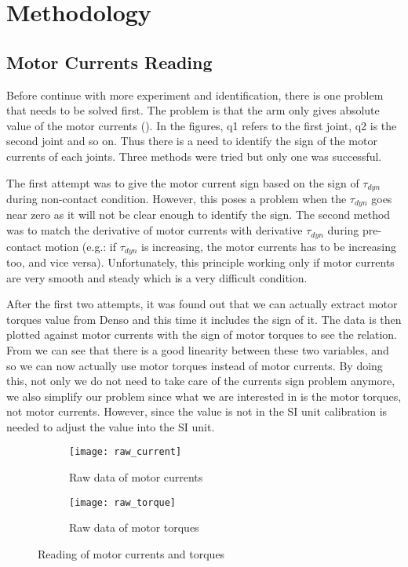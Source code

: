 \chapter{Methodology}
\section{Motor Currents Reading}
\label{motor currents}

Before continue with more experiment and identification, there is one problem that needs to be solved first. The problem is that the arm only gives absolute value of the motor currents (). In the figures, q1 refers to the first joint, q2 is the second joint and so on. Thus there is a need to identify the sign of the motor currents of each joints. Three methods were tried but only one was successful.

The first attempt was to give the motor current sign based on the sign of $\tau_{dyn}$ during non-contact condition. However, this poses a problem when the $\tau_{dyn}$ goes near zero as it will not be clear enough to identify the sign. The second method was to match the derivative of motor currents with derivative $\tau_{dyn}$ during pre-contact motion (e.g.: if $\tau_{dyn}$ is increasing, the motor currents has to be increasing too, and vice versa). Unfortunately, this principle working only if motor currents are very smooth and steady which is a very difficult condition.

After the first two attempts, it was found out that we can actually extract motor torques value from Denso and this time it includes the sign of it. The data is then plotted against motor currents with the sign of motor torques to see the relation. From  we can see that there is a good linearity between these two variables, and so we can now actually use motor torques instead of motor currents. By doing this, not only we do not need to take care of the currents sign problem anymore, we also simplify our problem since what we are interested in is the motor torques, not motor currents. However, since the value is not in the SI unit calibration is needed to adjust the value into the SI unit. 

\begin{figure}[H]
  \begin{subfigure}[t]{0.5\textwidth}
    \centering
    \texttt{[image: raw\_current]} 
    \caption{Raw data of motor currents }
    \label{fig:raw current}
  \end{subfigure}
  \begin{subfigure}[t]{0.5\textwidth}
    \centering
    \texttt{[image: raw\_torque]}
    \caption{Raw data of motor torques }
    \label{fig:raw torque}
  \end{subfigure}
  \caption{Reading of motor currents and torques}
\end{figure}

